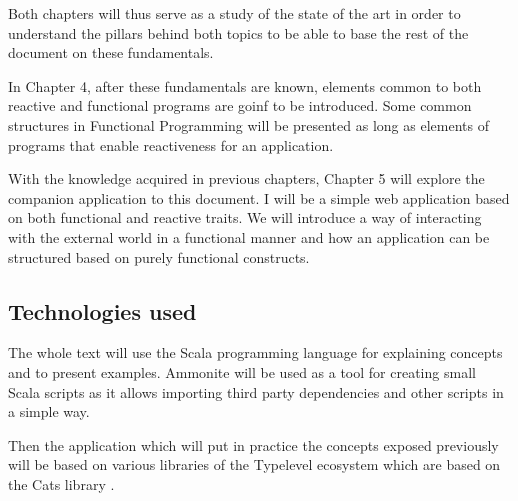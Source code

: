 \documentclass[../main.tex]{subfiles}
\begin{document}
Both chapters will thus serve as a study of the state of the art in order to understand the
pillars behind both topics to be able to base the rest of the document on these fundamentals.

In Chapter 4, after these fundamentals are known, elements common to
both reactive and functional programs are goinf to be introduced. Some common structures in
Functional Programming will be presented as long as elements of programs that enable reactiveness 
for an application.

With the knowledge acquired in previous chapters, Chapter 5 will explore the
companion application to this document. I will be a simple web application based on
both functional and reactive traits. We will introduce a way of interacting with
the external world in a functional manner and how an application can be
structured based on purely functional constructs.

\subsection{Technologies used}
The whole text will use the Scala programming language for explaining concepts
and to present examples. Ammonite \autocite{Ammonite} will be used as a tool for
creating small Scala scripts as it allows importing third party dependencies and
other scripts in a simple way.

Then the application which will put in practice the concepts exposed previously
will be based on various libraries of the Typelevel ecosystem
\autocite{2020Typelevel.scala} which are based on the Cats library \autocite{Cats:Home}.
\end{document}
